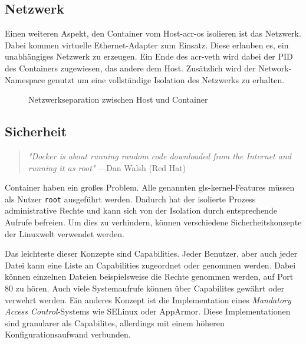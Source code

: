 \subsection{Netzwerk}
\label{sec:netzwerk}

Einen weiteren Aspekt, den Container vom Host-\gls{acr-os} isolieren ist das Netzwerk. Dabei kommen virtuelle Ethernet-Adapter zum Einsatz. Diese erlauben es, ein unabhängiges Netzwerk zu erzeugen. Ein Ende des \gls{acr-veth} wird dabei der PID des Containers zugewiesen, das andere dem Host. Zusätzlich wird der Network-Namespace genutzt um eine vollständige Isolation des Netzwerks zu erhalten.

\begin{figure}[h]
	\begin{center}
		\caption{Netzwerkseparation zwischen Host und Container}
		\label{fig:networkContainer}
	\end{center}
\end{figure}

\subsection{Sicherheit}
\label{sec:sicherheit}

\begin{quote}
	\textit{"Docker is about running random code downloaded from the Internet and running it as root"}
	\flushright
	\small{---Dan Walsh (Red Hat)}
\end{quote}

Container haben ein großes Problem. Alle genannten \gls{gls-kernel}-Features müssen als Nutzer \texttt{root} ausgeführt werden. Dadurch hat der isolierte Prozess administrative Rechte und kann sich von der Isolation durch entsprechende Aufrufe befreien. Um dies zu verhindern, können verschiedene Sicherheitskonzepte der Linuxwelt verwendet werden.

Das leichteste dieser Konzepte sind Capabilities. Jeder Benutzer, aber auch jeder Datei kann eine Liste an Capabilities zugeordnet oder genommen werden. Dabei können einzelnen Dateien beispielsweise die Rechte genommen werden, auf Port 80 zu hören. Auch viele Systemaufrufe können über Capabilites gewährt oder verwehrt werden. Ein anderes Konzept ist die Implementation eines \textit{Mandatory Access Control}-Systems wie SELinux oder AppArmor. Diese Implementationen sind granularer als Capabilites, allerdings mit einem höheren Konfigurationsaufwand verbunden.

